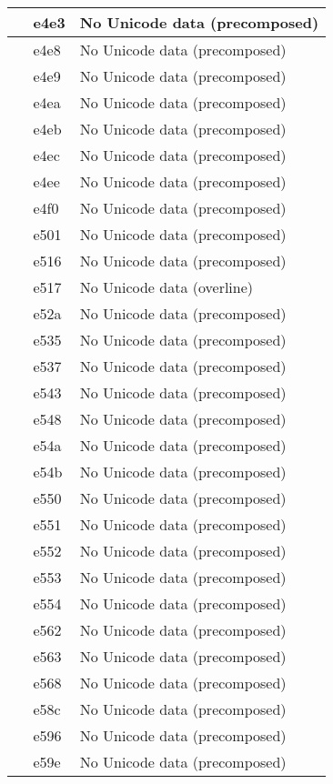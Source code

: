 \documentclass[12pt,letterpaper,openany]{book}
\begin{document}
\begin{center}
\begin{supertabular}{|m{0.25in}|m{0.5in}|m{4in}|}
			 & e4e3 & No Unicode data (precomposed)\\\hline
			 & e4e8 & No Unicode data (precomposed)\\\hline
			 & e4e9 & No Unicode data (precomposed)\\\hline
			 & e4ea & No Unicode data (precomposed)\\\hline
			 & e4eb & No Unicode data (precomposed)\\\hline
			 & e4ec & No Unicode data (precomposed)\\\hline
			 & e4ee & No Unicode data (precomposed)\\\hline
			 & e4f0 & No Unicode data (precomposed)\\\hline
			 & e501 & No Unicode data (precomposed)\\\hline
			 & e516 & No Unicode data (precomposed)\\\hline
			 & e517 & No Unicode data (overline)\\\hline
			 & e52a & No Unicode data (precomposed)\\\hline
			 & e535 & No Unicode data (precomposed)\\\hline
			 & e537 & No Unicode data (precomposed)\\\hline
			 & e543 & No Unicode data (precomposed)\\\hline
			 & e548 & No Unicode data (precomposed)\\\hline
			 & e54a & No Unicode data (precomposed)\\\hline
			 & e54b & No Unicode data (precomposed)\\\hline
			 & e550 & No Unicode data (precomposed)\\\hline
			 & e551 & No Unicode data (precomposed)\\\hline
			 & e552 & No Unicode data (precomposed)\\\hline
			 & e553 & No Unicode data (precomposed)\\\hline
			 & e554 & No Unicode data (precomposed)\\\hline
			 & e562 & No Unicode data (precomposed)\\\hline
			 & e563 & No Unicode data (precomposed)\\\hline
			 & e568 & No Unicode data (precomposed)\\\hline
			 & e58c & No Unicode data (precomposed)\\\hline
			 & e596 & No Unicode data (precomposed)\\\hline
			 & e59e & No Unicode data (precomposed)\\\hline

\end{supertabular}
\end{center}
\end{document}
